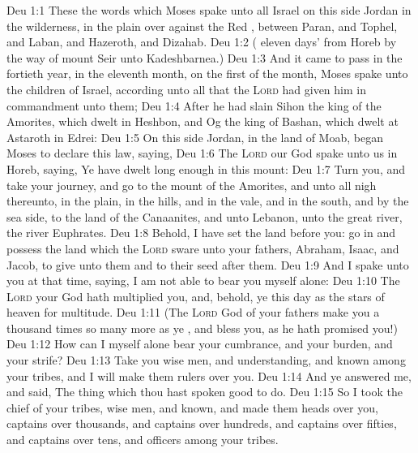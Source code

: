 \vs Deu 1:1 These  the words which Moses spake unto all Israel on this side Jordan in the wilderness, in the plain over against the Red , between Paran, and Tophel, and Laban, and Hazeroth, and Dizahab.
\vs Deu 1:2 ( eleven days'  from Horeb by the way of mount Seir unto Kadeshbarnea.)
\vs Deu 1:3 And it came to pass in the fortieth year, in the eleventh month, on the first  of the month,  Moses spake unto the children of Israel, according unto all that the \textsc{Lord} had given him in commandment unto them;
\vs Deu 1:4 After he had slain Sihon the king of the Amorites, which dwelt in Heshbon, and Og the king of Bashan, which dwelt at Astaroth in Edrei:
\vs Deu 1:5 On this side Jordan, in the land of Moab, began Moses to declare this law, saying,
\vs Deu 1:6 The \textsc{Lord} our God spake unto us in Horeb, saying, Ye have dwelt long enough in this mount:
\vs Deu 1:7 Turn you, and take your journey, and go to the mount of the Amorites, and unto all  nigh thereunto, in the plain, in the hills, and in the vale, and in the south, and by the sea side, to the land of the Canaanites, and unto Lebanon, unto the great river, the river Euphrates.
\vs Deu 1:8 Behold, I have set the land before you: go in and possess the land which the \textsc{Lord} sware unto your fathers, Abraham, Isaac, and Jacob, to give unto them and to their seed after them.
\vs Deu 1:9 And I spake unto you at that time, saying, I am not able to bear you myself alone:
\vs Deu 1:10 The \textsc{Lord} your God hath multiplied you, and, behold, ye  this day as the stars of heaven for multitude.
\vs Deu 1:11 (The \textsc{Lord} God of your fathers make you a thousand times so many more as ye , and bless you, as he hath promised you!)
\vs Deu 1:12 How can I myself alone bear your cumbrance, and your burden, and your strife?
\vs Deu 1:13 Take you wise men, and understanding, and known among your tribes, and I will make them rulers over you.
\vs Deu 1:14 And ye answered me, and said, The thing which thou hast spoken  good  to do.
\vs Deu 1:15 So I took the chief of your tribes, wise men, and known, and made them heads over you, captains over thousands, and captains over hundreds, and captains over fifties, and captains over tens, and officers among your tribes.
